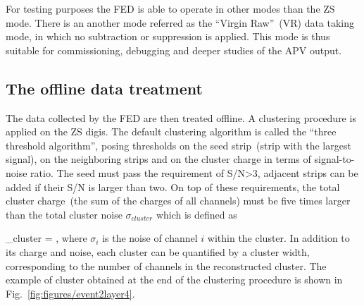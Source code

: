For testing purposes the FED is able to operate in other modes than the ZS mode. There is an another mode referred as the ``Virgin Raw''~(VR) data taking mode, in which no subtraction or suppression is applied. This mode is thus suitable for commissioning, debugging and deeper studies of the APV output.





\subsection{The offline data treatment~\label{sec:localreco}}


The data collected by the FED are then treated offline. A clustering procedure is applied on the ZS digis. The default clustering algorithm is called the ``three threshold algorithm'', posing thresholds on the seed strip~(strip with the largest signal), on the neighboring strips and on the cluster charge in terms of signal-to-noise ratio. The seed must pass the requirement of S/N>3, adjacent strips can be added if their S/N is larger than two. On top of these requirements, the total cluster charge~(the sum of the charges of all channels) must be five times larger than the total cluster noise $\sigma_{cluster}$ which is defined as


{
    \sigma_{cluster} = ,
}
where $\sigma_{i}$ is the noise of channel $i$ within the cluster. In addition to its charge and noise, each cluster can be quantified by a cluster width, corresponding to the number of channels in the reconstructed cluster. The example of cluster obtained at the end of the clustering procedure is shown in Fig.~\ref{fig:figures/event2layer4}.

